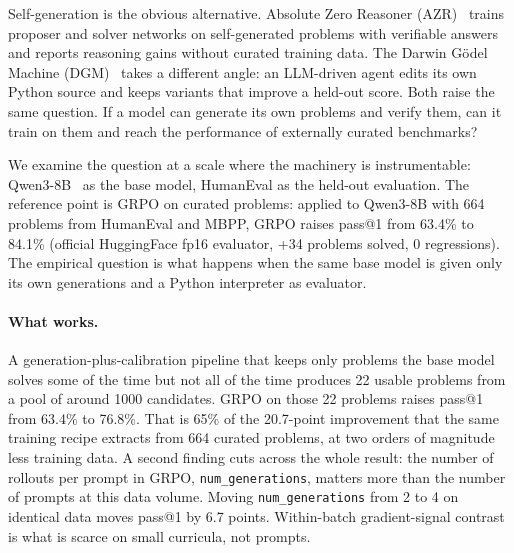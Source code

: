 \documentclass[11pt,a4paper]{article}
\begin{document}
Self-generation is the obvious alternative.
Absolute Zero Reasoner (AZR)~\citep{zhao2025azr} trains proposer and solver networks on self-generated problems with verifiable answers and reports reasoning gains without curated training data.
The Darwin G{\"o}del Machine (DGM)~\citep{zhang2025dgm} takes a different angle: an LLM-driven agent edits its own Python source and keeps variants that improve a held-out score.
Both raise the same question.
If a model can generate its own problems and verify them, can it train on them and reach the performance of externally curated benchmarks?

We examine the question at a scale where the machinery is instrumentable: Qwen3-8B~\citep{qwen3} as the base model, HumanEval as the held-out evaluation.
The reference point is GRPO on curated problems: applied to Qwen3-8B with 664 problems from HumanEval and MBPP, GRPO raises pass@1 from 63.4\% to 84.1\% (official HuggingFace fp16 evaluator, +34 problems solved, 0 regressions).
The empirical question is what happens when the same base model is given only its own generations and a Python interpreter as evaluator.

\paragraph{What works.}
A generation-plus-calibration pipeline that keeps only problems the base model solves some of the time but not all of the time produces 22 usable problems from a pool of around 1000 candidates.
GRPO on those 22 problems raises pass@1 from 63.4\% to 76.8\%.
That is 65\% of the 20.7-point improvement that the same training recipe extracts from 664 curated problems, at two orders of magnitude less training data.
A second finding cuts across the whole result: the number of rollouts per prompt in GRPO, \texttt{num\_generations}, matters more than the number of prompts at this data volume.
Moving \texttt{num\_generations} from 2 to 4 on identical data moves pass@1 by 6.7 points.
Within-batch gradient-signal contrast is what is scarce on small curricula, not prompts.
\end{document}
